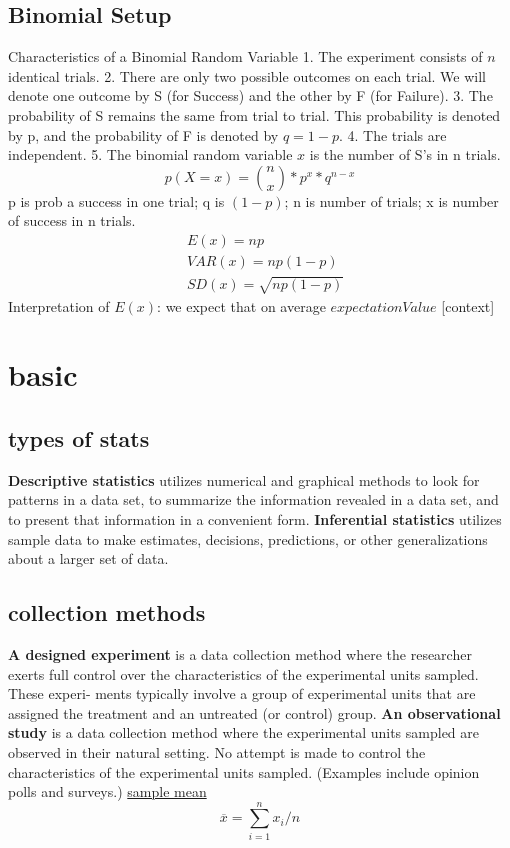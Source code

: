 \documentclass[fontsize=6pt, paper=a4]{scrartcl}
\begin{document}
\begin{multicols*}{4}
{\subsection{Binomial Setup}
Characteristics of a Binomial Random Variable
1. The experiment consists of $n$ identical trials.
2. There are only two possible outcomes on each trial. We will denote one outcome by S (for Success) and the other by F (for Failure).
3. The probability of S remains the same from trial to trial. This probability is denoted by p, and the probability of F is denoted by $q = 1 - p$.
4. The trials are independent.
5. The binomial random variable $x$ is the number of S’s in n trials.
\begin{equation}
	p(X=x)= {n\choose x}*p^x*q^{n-x}
\end{equation}
p is prob a success in one trial; q is $(1-p)$; n is number of trials; x is number of success in n trials.
\begin{align}
	&E(x)=np\\
	&VAR(x)=np(1-p)\\
	&SD(x)=\sqrt{np(1-p)}
\end{align}
Interpretation of $E(x)$: we expect that on average $expectationValue$ [context] 
}

\section{basic}
\subsection{types of stats}
\textbf{Descriptive statistics} utilizes numerical and graphical methods to look for patterns in a data set, to summarize the information revealed in a data set, and to present that information in a convenient form. 
\textbf{Inferential statistics} utilizes sample data to make estimates, decisions, predictions, or other generalizations about a larger set of data. 
\subsection{collection methods}
\textbf{A designed experiment} is a data collection method where the researcher exerts full control over the characteristics of the experimental units sampled. These experi- ments typically involve a group of experimental units that are assigned the treatment and an untreated (or control) group. 
\textbf{An observational study} is a data collection method where the experimental units sampled are observed in their natural setting. No attempt is made to control the characteristics of the experimental units sampled. (Examples include opinion polls and surveys.) 
\underline{sample mean}
\begin{equation}
	\overline{x}=\sum_{i=1}^n x_i/n
\end{equation}


\end{multicols*}
\end{document}
